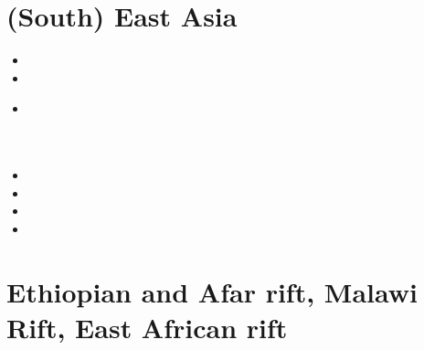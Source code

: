 \section{(South) East Asia}

\begin{small}
\begin{itemize}
\item[\twothousand]
\item[\twothousandfour]
\item[\twothousandfifteen]
 \\
 \\
 \\
\item[\twothousandsixteen]
\item[2017]
\item[\twothousandtwentytwo] 
\item[2026]
\end{itemize}
\end{small}

\section{Ethiopian and Afar rift, Malawi Rift, East African rift} 

